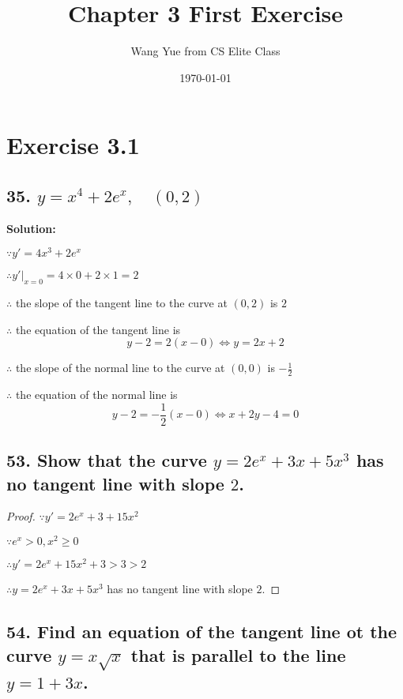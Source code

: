 \documentclass{article}
\newenvironment{solution}{
    \par \textbf{Solution: } \quad \par
}{\par}
\begin{document}
    \title{Chapter 3 First Exercise}
    \author{Wang Yue from CS Elite Class}
    \date{\today}

    \maketitle

    \section*{Exercise 3.1}

    \subsection*{35. $y = x^4 + 2e^x, \quad (0,2)$}

    \begin{solution}
        $\because y' = 4x^3 + 2e^x$

        $\therefore y'|_{x = 0} = 4 \times 0 + 2 \times 1 = 2$

        $\therefore$ the slope of the tangent line to the curve at $(0, 2)$ is $2$ 

        $\therefore$ the equation of the tangent line is $$y - 2 = 2(x - 0) \iff y = 2x + 2$$
        
        $\therefore$ the slope of the normal line to the curve at $(0,0)$ is $-\frac 1 2$

        $\therefore$ the equation of the normal line is $$y - 2 = -\frac 1 2 (x - 0) \iff x + 2y - 4 = 0$$
    \end{solution}

    \subsection*{53. Show that the curve $y = 2e^x + 3x + 5x^3$ has no tangent line with slope $2$.}

    \begin{proof}
        $\because y' = 2e^x + 3 + 15x^2$

        $\because e^x > 0, x^2 \geq 0$

        $\therefore y' = 2e^x + 15x^2 + 3 > 3 > 2$

        $\therefore y = 2e^x + 3x + 5x^3$ has no tangent line with slope $2$.
    \end{proof}

    \subsection*{54. Find an equation of the tangent line ot the curve $y = x \sqrt x $ that is parallel to the line $y = 1 + 3x$.}
\end{document}
